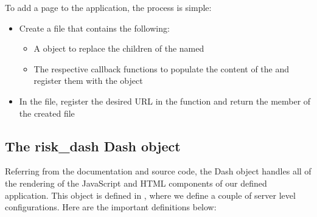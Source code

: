 \documentclass[letterpaper,10pt,english]{sphinxmanual}
\begin{document}
\sphinxAtStartPar
To add a page to the application, the process is simple:
\begin{itemize}
\item {} 
\sphinxAtStartPar
Create a  file that contains the following:
\begin{itemize}
\item {} 
\sphinxAtStartPar
A  object to replace the children of
the  named 

\item {} 
\sphinxAtStartPar
The respective callback functions to populate the content of the
 and register them with the
 object

\end{itemize}

\item {} 
\sphinxAtStartPar
In the  file, register the desired URL in the
 function and return the  member of the
created  file

\end{itemize}


\subsection{The risk\_dash Dash object}
\label{\detokenize{dashapp_documentation:the-risk-dash-dash-object}}
\sphinxAtStartPar
Referring from the  documentation and
source code, the Dash object handles all of the rendering of the
JavaScript and HTML components of our defined application. This object
is defined in , where we define a couple of server level
configurations. Here are the important definitions below:
\end{document}
